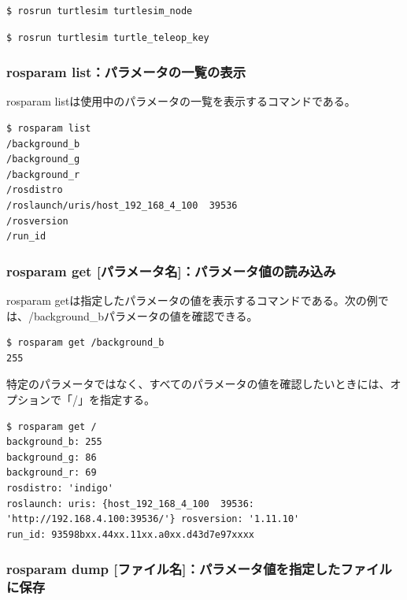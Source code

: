 \begin{lstlisting}[language=ROS]
$ rosrun turtlesim turtlesim_node
\end{lstlisting}

\begin{lstlisting}[language=ROS]
$ rosrun turtlesim turtle_teleop_key
\end{lstlisting}

\subsubsection{rosparam list：パラメータの一覧の表示}

rosparam listは使用中のパラメータの一覧を表示するコマンドである。

\begin{lstlisting}[language=ROS]
$ rosparam list
/background_b
/background_g
/background_r
/rosdistro
/roslaunch/uris/host_192_168_4_100  39536
/rosversion
/run_id
\end{lstlisting}

\subsubsection{rosparam get [パラメータ名]：パラメータ値の読み込み}

rosparam getは指定したパラメータの値を表示するコマンドである。次の例では、/background\_bパラメータの値を確認できる。

\begin{lstlisting}[language=ROS]
$ rosparam get /background_b
255
\end{lstlisting}

特定のパラメータではなく、すべてのパラメータの値を確認したいときには、オプションで「/」を指定する。

\begin{lstlisting}[language=ROS]
$ rosparam get /
background_b: 255
background_g: 86
background_r: 69
rosdistro: 'indigo'
roslaunch: uris: {host_192_168_4_100  39536: 'http://192.168.4.100:39536/'} rosversion: '1.11.10'
run_id: 93598bxx.44xx.11xx.a0xx.d43d7e97xxxx
\end{lstlisting}

\subsubsection{rosparam dump [ファイル名]：パラメータ値を指定したファイルに保存}

